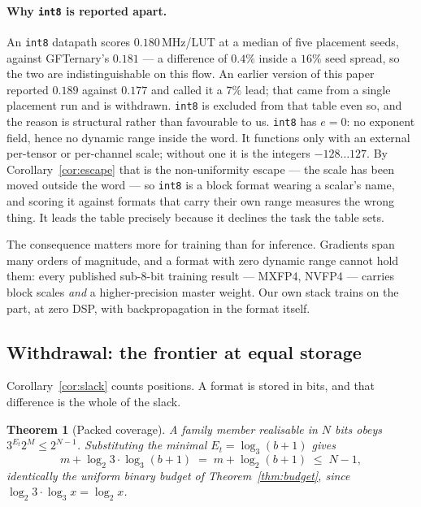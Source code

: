 \documentclass[11pt]{article}
\newtheorem{theorem}{Theorem}
\theoremstyle{definition}
\begin{document}
\paragraph{Why \texttt{int8} is reported apart.}
An \texttt{int8} datapath scores $0.180$\,MHz/LUT at a median of five placement
seeds, against GFTernary's $0.181$ --- a difference of $0.4\%$ inside a $16\%$
seed spread, so the two are indistinguishable on this flow. An earlier version of
this paper reported $0.189$ against $0.177$ and called it a $7\%$ lead; that came
from a single placement run and is withdrawn. \texttt{int8} is excluded from that table even so, and the
reason is structural rather than favourable to us. \texttt{int8} has $e=0$: no exponent field, hence no dynamic
range inside the word. It functions only with an external per-tensor or
per-channel scale; without one it is the integers $-128\ldots127$. By
Corollary~\ref{cor:escape} that is the non-uniformity escape --- the scale has
been moved outside the word --- so \texttt{int8} is a block format wearing a
scalar's name, and scoring it against formats that carry their own range measures
the wrong thing. It leads the table precisely because it declines the task the
table sets.

The consequence matters more for training than for inference. Gradients span many
orders of magnitude, and a format with zero dynamic range cannot hold them: every
published sub-8-bit training result --- MXFP4, NVFP4 --- carries block scales
\emph{and} a higher-precision master weight. Our own stack trains on the part, at
zero DSP, with backpropagation in the format itself.


\subsection{Withdrawal: the frontier at equal storage}
\label{sec:packedfrontier}

Corollary~\ref{cor:slack} counts positions.
A format is stored in bits, and that difference is the whole of the slack.

\begin{theorem}[Packed coverage]
\label{thm:packedcov}
A family member realisable in $N$ bits obeys $3^{E_t}2^{M} \le 2^{N-1}$.
Substituting the minimal $E_t = \log_3(b+1)$ gives
\[
  m + \log_2 3 \cdot \log_3(b+1) \;=\; m + \log_2(b+1) \;\le\; N-1 ,
\]
identically the uniform binary budget of Theorem~\ref{thm:budget}, since
$\log_2 3 \cdot \log_3 x = \log_2 x$.
\end{theorem}
\end{document}
